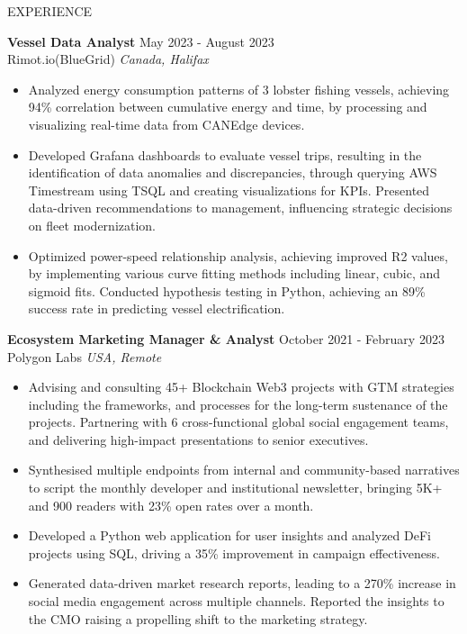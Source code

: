 \documentclass{resume} %
\begin{document}
\begin{rSection}{EXPERIENCE}

\textbf{Vessel Data Analyst} \hfill May 2023 - August 2023\\
Rimot.io(BlueGrid) \hfill \textit{Canada, Halifax}
 \begin{itemize}
    \itemsep -3pt {} 
    \item Analyzed energy consumption patterns of 3 lobster fishing vessels, achieving 94\% correlation between cumulative energy and time, by processing and visualizing real-time data from CANEdge devices.
    \item Developed Grafana dashboards to evaluate vessel trips, resulting in the identification of data anomalies and discrepancies, through querying AWS Timestream using TSQL and creating visualizations for KPIs. Presented data-driven recommendations to management, influencing strategic decisions on fleet modernization.
    \item Optimized power-speed relationship analysis, achieving improved R2 values, by implementing various curve fitting methods including linear, cubic, and sigmoid fits. Conducted hypothesis testing in Python, achieving an 89\% success rate in predicting vessel electrification.
 \end{itemize}


\textbf{Ecosystem Marketing Manager \& Analyst} \hfill October 2021 - February 2023\\
Polygon Labs \hfill \textit{USA, Remote}
 \begin{itemize}
    \itemsep -3pt {} 
    \item Advising and consulting 45+ Blockchain Web3 projects with GTM strategies including the frameworks, and processes for the long-term sustenance of the projects. Partnering with 6 cross-functional global social engagement teams, and delivering high-impact presentations to senior executives.
    \item Synthesised multiple endpoints from internal and community-based narratives to script the monthly developer and institutional newsletter, bringing 5K+ and 900 readers with 23\% open rates over a month.
    \item Developed a Python web application for user insights and analyzed DeFi projects using SQL, driving a 35\% improvement in campaign effectiveness.
    \item Generated data-driven market research reports, leading to a 270\% increase in social media engagement across multiple channels. Reported the insights to the CMO raising a propelling shift to the marketing strategy.

 \end{itemize}

\end{rSection} 
\end{document}

